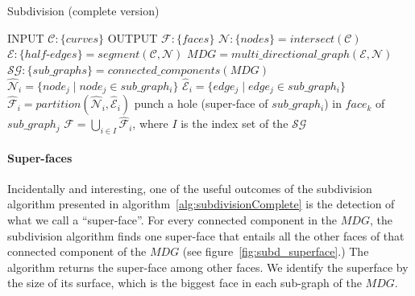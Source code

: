 \begin{algorithm}
  \caption {Subdivision (complete version)}
  \label{alg:subdivisionComplete}
  \begin{algorithmic}
    \STATE INPUT  $\mathcal{C}:\{curves\}$
    \STATE OUTPUT  $\mathcal{F}:\{faces\}$
    \STATE \quad
    \STATE $\mathcal{N}:\{nodes\} = \mathit{intersect} \left( \mathcal{C} \right)$
    \STATE $\mathcal{E}:\{half\text{-}edges\} = \mathit{segment} \left( \mathcal{C}, \mathcal{N} \right)$
    \STATE $\mathit{MDG}= \mathit{multi\_directional\_graph} \left( \mathcal{E}, \mathcal{N} \right)$
    \STATE $\mathcal{SG}:\{sub\_graphs\} = connected\_components(\mathit{MDG})$
    \STATE \quad
    \STATE $ \hat{\mathcal{N}}_i = \{node_j \mid node_j \in sub\_graph_i \} $
    \STATE $ \hat{\mathcal{E}}_i = \{edge_j \mid edge_j \in sub\_graph_i \} $
    \STATE $ \hat{\mathcal{F}}_i= \mathit{partition} \left( \hat{\mathcal{N}}_i, \hat{\mathcal{E}}_i \right)$
    \ENDFOR
    \STATE \quad
    \STATE punch a hole (super-face of $sub\_graph_i$) in $face_k$ of $sub\_graph_j$ 
    \ENDIF
    \ENDFOR
    \STATE \quad
    \STATE $ \mathcal{F} = \displaystyle \bigcup_{i\in I} \hat{\mathcal{F}}_i $, \quad where $I$ is the index set of the $\mathcal{SG}$
  \end{algorithmic}
\end{algorithm}


\paragraph{Super-faces}
Incidentally and interesting, one of the useful outcomes of the subdivision algorithm presented in algorithm~\ref{alg:subdivisionComplete} is the detection of what we call a ``super-face''.
For every connected component in the $\mathit{MDG}$, the subdivision algorithm finds one super-face that entails all the other faces of that connected component of the $\mathit{MDG}$ (see figure~\ref{fig:subd_superface}.)
The algorithm returns the super-face among other faces.
We identify the superface by the size of its surface, which is the biggest face in each sub-graph of the $\mathit{MDG}$.


